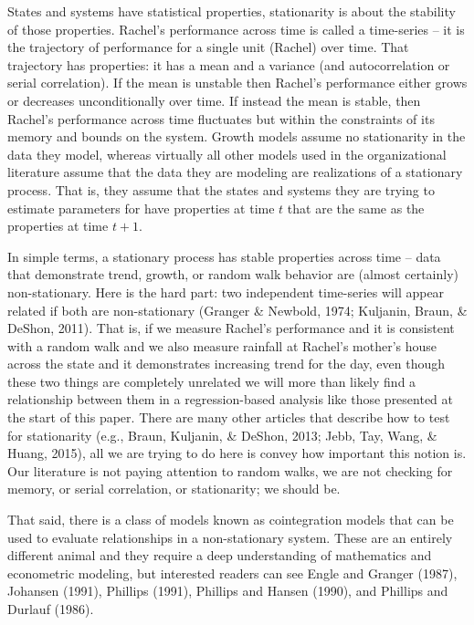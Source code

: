 \documentclass[english,,man]{apa6}
\theoremstyle{definition}
\theoremstyle{definition}
\theoremstyle{definition}
\theoremstyle{remark}
\begin{document}
States and systems have statistical properties, stationarity is about
the stability of those properties. Rachel's performance across time is
called a time-series -- it is the trajectory of performance for a single
unit (Rachel) over time. That trajectory has properties: it has a mean
and a variance (and autocorrelation or serial correlation). If the mean
is unstable then Rachel's performance either grows or decreases
unconditionally over time. If instead the mean is stable, then Rachel's
performance across time fluctuates but within the constraints of its
memory and bounds on the system. Growth models assume no stationarity in
the data they model, whereas virtually all other models used in the
organizational literature assume that the data they are modeling are
realizations of a stationary process. That is, they assume that the
states and systems they are trying to estimate parameters for have
properties at time \(t\) that are the same as the properties at time
\(t + 1\).

In simple terms, a stationary process has stable properties across time
-- data that demonstrate trend, growth, or random walk behavior are
(almost certainly) non-stationary. Here is the hard part: two
independent time-series will appear related if both are non-stationary
(Granger \& Newbold, 1974; Kuljanin, Braun, \& DeShon, 2011). That is,
if we measure Rachel's performance and it is consistent with a random
walk and we also measure rainfall at Rachel's mother's house across the
state and it demonstrates increasing trend for the day, even though
these two things are completely unrelated we will more than likely find
a relationship between them in a regression-based analysis like those
presented at the start of this paper. There are many other articles that
describe how to test for stationarity (e.g., Braun, Kuljanin, \& DeShon,
2013; Jebb, Tay, Wang, \& Huang, 2015), all we are trying to do here is
convey how important this notion is. Our literature is not paying
attention to random walks, we are not checking for memory, or serial
correlation, or stationarity; we should be.

That said, there is a class of models known as cointegration models that
can be used to evaluate relationships in a non-stationary system. These
are an entirely different animal and they require a deep understanding
of mathematics and econometric modeling, but interested readers can see
Engle and Granger (1987), Johansen (1991), Phillips (1991), Phillips and
Hansen (1990), and Phillips and Durlauf (1986).
\end{document}
